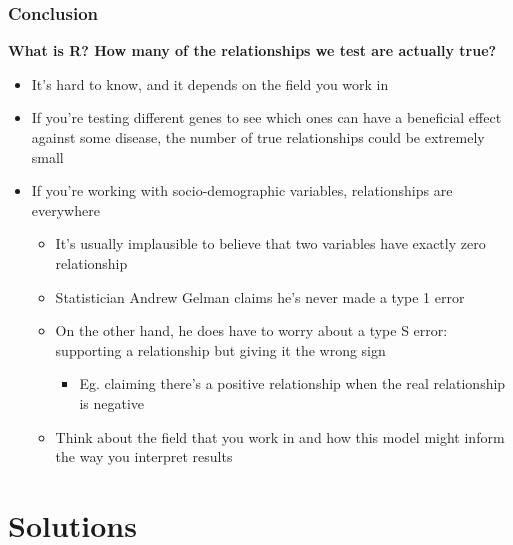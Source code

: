 \documentclass[10pt, block=fill]{beamer}
\begin{document}
\begin{frame}
    \frametitle{Conclusion}
    
    \textbf{What is R? How many of the relationships we test are actually true?}
    \begin{itemize}
        \item It's hard to know, and it depends on the field you work in
        \item If you're testing different genes to see which ones can have a beneficial effect against some disease, the number of true relationships could be extremely small
        \item If you're working with socio-demographic variables, relationships are everywhere
        \begin{itemize}
            \item It's usually implausible to believe that two variables have exactly zero relationship
            \item Statistician Andrew Gelman claims he's never made a type 1 error
            \item On the other hand, he does have to worry about a type S error: supporting a relationship but giving it the wrong sign
            \begin{itemize}
                \item Eg. claiming there's a positive relationship when the real relationship is negative
            \end{itemize}
            \item Think about the field that you work in and how this model might inform the way you interpret results
        \end{itemize}
    \end{itemize}
\end{frame}


\section{Solutions}
\end{document}
